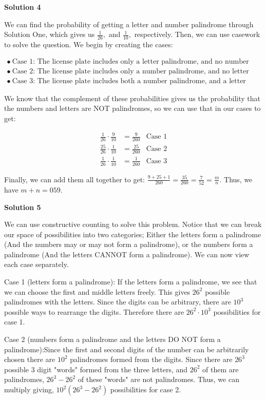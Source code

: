 \begin{enumerate}
\textbf{Solution 4}

We can find the probability of getting a letter and number palindrome through Solution One, which gives us $\frac{1}{26},$ and $\frac{1}{10},$ respectively. Then, we can use casework to solve the question. We begin by creating the cases:

 \begin{align*}\bullet\ \text{Case 1: The license plate includes only a letter palindrome, and no number palindrome} \\\bullet\ \text{Case 2: The license plate includes only a number palindrome, and no letter palindrome} \\\bullet\ \text{Case 3: The license plate includes both a number palindrome, and a letter palindrome}\end{align*}


 We know that the complement of these probabilities gives us the probability that the numbers and letters are NOT palindromes, so we can use that in our cases to get: 

 \begin{align}\frac{1}{26} \cdot \frac{9}{10} &= \frac{9}{260} & \text{Case 1}\\\frac{25}{26} \cdot \frac{1}{10} &= \frac{25}{260} & \text{Case 2}\\\frac{1}{26} \cdot \frac{1}{10} &= \frac{1}{260} & \text{Case 3}\end{align}

 Finally, we can add them all together to get: $\frac{9 + 25 + 1}{260} = \frac{35}{260} = \frac{7}{52} = \frac{m}{n}.$ Thus, we have $m + n = \boxed{059}.$




\textbf{Solution 5}

We can use constructive counting to solve this problem. Notice that we can break our space of possibilities into two categories; Either the letters form a palindrome (And the numbers may or may not form a palindrome), or the numbers form a palindrome (And the letters CANNOT form a palindrome). We can now view each case separately.

 
Case 1 (letters form a palindrome): If the letters form a palindrome, we see that we can choose the first and middle letters freely. This gives $26^2$ possible palindromes with the letters. Since the digits can be arbitrary, there are $10^3$ possible ways to rearrange the digits. Therefore there are $26^2\cdot 10^3$ possibilities for case 1. 

 
Case 2 (numbers form a palindrome and the letters DO NOT form a palindrome):Since the first and second digits of the number can be arbitrarily chosen there are $10^2$ palindromes formed from the digits. Since there are $26^3$ possible $3$ digit "words" formed from the three letters, and $26^2$ of them are palindromes, $26^3-26^2$ of these "words" are not palindromes. Thus, we can multiply giving, $10^2(26^3-26^2)$ possibilities for case 2.


\end{enumerate}

